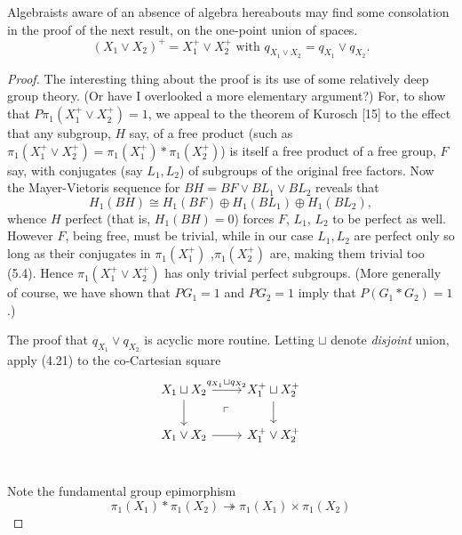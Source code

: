 \documentclass[openany,leqno]{book}  %
\begin{document}
Algebraists aware of an absence of algebra hereabouts may find some consolation in the proof of the next result, on the one-point union of spaces.
\begin{equation}
	(X_1 \vee X_2)^+ = X_1^+ \vee X_2^+\mbox{ with } q_{X_1\vee X_2}=q_{X_1}\vee q_{X_2}.
\end{equation}
\begin{proof}
 The interesting thing about the proof is its use of some relatively deep group theory. (Or have I overlooked a more elementary argument?) For, to show that $P\pi_1(X_1^+ \vee X_2^+)=1$, we  appeal to the theorem of Kurosch [15] to the effect that any subgroup, $H$ say, of a free product (such as $\pi_1(X_1^+ \vee X_2^+) = \pi_1 (X_1^+)* \pi_1(X_2^+)$) is itself a free product of a free group, $F$ say, with conjugates (say $L_1,L_2$) of subgroups of the original free factors. Now the Mayer-Vietoris sequence for $BH = BF\vee BL_1\vee BL_2$ reveals that
\[H_1(BH)\cong H_1(BF)\oplus H_1(BL_1)\oplus H_1(BL_2),\]
whence $H$ perfect (that is, $H_1(BH) = 0$) forces $F$, $L_1$, $L_2$ to be perfect as well. However $F$, being free, must be trivial, while in our case $L_1, L_2$ are perfect only so long as their conjugates in $\pi_1(X_1^+)$ ,$\pi_1(X_2^+)$ are, making them trivial too (5.4). Hence $\pi_1(X_1^+ \vee X_2^+)$ has only trivial perfect subgroups. (More generally of course, we have shown that $PG_1 = 1$ and $PG_2 = 1$ imply that $P(G_1*G_2)=1$.)

The proof that $q_{X_1}\vee q_{X_2}$ is acyclic more routine. Letting $\sqcup$ denote {\em disjoint} union, apply (4.21) to the co-Cartesian square
\[
 \begin{tikzcd}
 X_1\sqcup X_2 \arrow{r}{q_{X_1}\sqcup q_{X_2} } \arrow{d} \arrow[dr, phantom, "\ulcorner"] & X_1^+\sqcup X_2^+ \arrow{d}\\
 X_1\vee X_2 \arrow{r} & X_1^+\vee X_2^+\\
 \end{tikzcd}
 \]

Note the fundamental group epimorphism
\[\pi_1(X_1) *\pi_1(X_2) \twoheadrightarrow \pi_1(X_1) \times \pi_1(X_2)\]


\end{proof}
\end{document}
